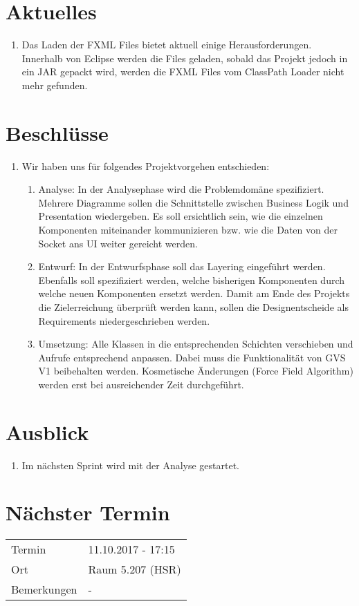 \documentclass[11pt, a4paper,oneside]{scrartcl}
\begin{document}
\section{Aktuelles}
\begin{enumerate}
	\item Das Laden der FXML Files bietet aktuell einige Herausforderungen. Innerhalb von Eclipse werden die Files geladen, sobald das Projekt jedoch in ein JAR gepackt wird, werden die FXML Files vom ClassPath Loader nicht mehr gefunden.
\end{enumerate}

\section{Beschlüsse}
\begin{enumerate}
	\item Wir haben uns für folgendes Projektvorgehen entschieden:
	\begin{enumerate}
		\item Analyse: In der Analysephase wird die Problemdomäne spezifiziert. Mehrere Diagramme sollen die Schnittstelle zwischen Business Logik und Presentation wiedergeben. Es soll ersichtlich sein, wie die einzelnen Komponenten miteinander kommunizieren bzw. wie die Daten von der Socket ans UI weiter gereicht werden.
		\item Entwurf: In der Entwurfsphase soll das Layering eingeführt werden. Ebenfalls soll spezifiziert werden, welche bisherigen Komponenten durch welche neuen Komponenten ersetzt werden. Damit am Ende des Projekts die Zielerreichung überprüft werden kann, sollen die Designentscheide als Requirements niedergeschrieben werden. 
		\item Umsetzung: Alle Klassen in die entsprechenden Schichten verschieben und Aufrufe entsprechend anpassen. Dabei muss die Funktionalität von GVS V1 beibehalten werden. Kosmetische Änderungen (Force Field Algorithm) werden erst bei ausreichender Zeit durchgeführt.
	\end{enumerate}
\end{enumerate}

\section{Ausblick}
\begin{enumerate}
	\item Im nächsten Sprint wird mit der Analyse gestartet.
\end{enumerate}


\section{Nächster Termin}
\begin{tabu} to \linewidth {l X }
	\toprule
	Termin & 11.10.2017 - 17:15 \\
	Ort & Raum 5.207 (HSR) \\
	Bemerkungen & - \\
	\bottomrule
\end{tabu}
\end{document}
